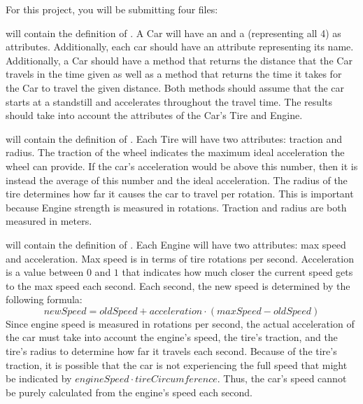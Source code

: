 \documentclass[11pt]{cselabheader}
\begin{document}
\begin{ex}
  For this project, you will be submitting four files:

   will contain the definition of . A
  Car will have an  and a   (representing all 4)
  as attributes. Additionally, each car should have an attribute representing its name.
  Additionally, a Car should have a method  that returns
  the distance that the Car travels in the time given as well as a method
   that returns the time it takes for the Car to travel
  the given distance. Both methods should assume that
  the car starts at a standstill and accelerates throughout the travel time. The results
  should take into account the attributes of the Car's Tire and Engine.
  
   will contain the definition of . Each Tire
  will have two attributes: traction and radius. The traction of the wheel indicates the
  maximum ideal acceleration the wheel can provide. If the car's acceleration would be
  above this number, then it is instead the average of this number and the
  ideal acceleration. The radius of the tire determines how far it causes the
  car to travel per rotation. This is important because Engine strength is
  measured in rotations. Traction and radius are both measured in meters.
  
   will contain the definition of
  . Each Engine will have two attributes:
  max speed and acceleration. Max speed is in terms of tire rotations per
  second. Acceleration is a value between $0$ and $1$ that indicates how much
  closer the current speed gets to the max speed each second. Each second, the
  new speed is determined by the following formula:
  $$newSpeed = oldSpeed + acceleration \cdot \left(maxSpeed - oldSpeed\right)$$
  Since engine speed is measured in rotations per second, the actual
  acceleration of the car must take into account the engine's speed, the tire's
  traction, and the tire's radius to determine how far it travels each second.
  Because of the tire's traction, it is possible that the car is not
  experiencing the full speed that might be indicated by
  $engineSpeed \cdot tireCircumference$. Thus, the car's speed cannot be purely
  calculated from the engine's speed each second.


\end{ex}
\end{document}
